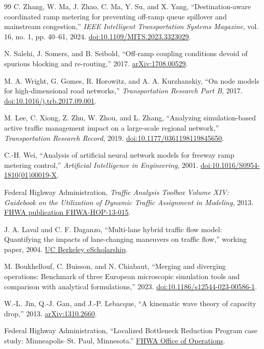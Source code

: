 \documentclass[10pt]{article}
\begin{document}
\begin{thebibliography}{99}
C. Zhang, W. Ma, J. Zhao, C. Ma, Y. Su, and X. Yang,
``Destination-aware coordinated ramp metering for preventing off-ramp queue spillover and mainstream congestion,''
\emph{IEEE Intelligent Transportation Systems Magazine}, vol. 16, no. 1, pp. 40--61, 2024.
\href{https://doi.org/10.1109/MITS.2023.3323029}{doi:10.1109/MITS.2023.3323029}.

N. Salehi, J. Somers, and B. Seibold,
``Off-ramp coupling conditions devoid of spurious blocking and re-routing,'' 2017.
\href{https://arxiv.org/abs/1708.00529}{arXiv:1708.00529}.

M. A. Wright, G. Gomes, R. Horowitz, and A. A. Kurzhanskiy,
``On node models for high-dimensional road networks,''
\emph{Transportation Research Part B}, 2017.
\href{https://doi.org/10.1016/j.trb.2017.09.001}{doi:10.1016/j.trb.2017.09.001}.

M. Lee, C. Xiong, Z. Zhu, W. Zhou, and L. Zhang,
``Analyzing simulation-based active traffic management impact on a large-scale regional network,''
\emph{Transportation Research Record}, 2019.
\href{https://doi.org/10.1177/0361198119845650}{doi:10.1177/0361198119845650}.

C.-H. Wei,
``Analysis of artificial neural network models for freeway ramp metering control,''
\emph{Artificial Intelligence in Engineering}, 2001.
\href{https://doi.org/10.1016/S0954-1810(01)00019-X}{doi:10.1016/S0954-1810(01)00019-X}.

Federal Highway Administration,
\emph{Traffic Analysis Toolbox Volume XIV: Guidebook on the Utilization of Dynamic Traffic Assignment in Modeling}, 2013.
\href{https://ops.fhwa.dot.gov/publications/fhwahop13015/sec3.htm}{FHWA publication FHWA-HOP-13-015}.

J. A. Laval and C. F. Daganzo,
``Multi-lane hybrid traffic flow model: Quantifying the impacts of lane-changing maneuvers on traffic flow,'' working paper, 2004.
\href{https://escholarship.org/uc/item/8w70q261}{UC Berkeley eScholarship}.

M. Boukhellouf, C. Buisson, and N. Chiabaut,
``Merging and diverging operations: Benchmark of three European microscopic simulation tools and comparison with analytical formulations,'' 2023.
\href{https://doi.org/10.1186/s12544-023-00586-1}{doi:10.1186/s12544-023-00586-1}.

W.-L. Jin, Q.-J. Gan, and J.-P. Lebacque,
``A kinematic wave theory of capacity drop,'' 2013.
\href{https://arxiv.org/abs/1310.2660}{arXiv:1310.2660}.

Federal Highway Administration,
``Localized Bottleneck Reduction Program case study: Minneapolis--St. Paul, Minnesota.''
\href{https://ops.fhwa.dot.gov/bn/resources/case_studies/minnstp_mn.htm}{FHWA Office of Operations}.

\end{thebibliography}
\end{document}
